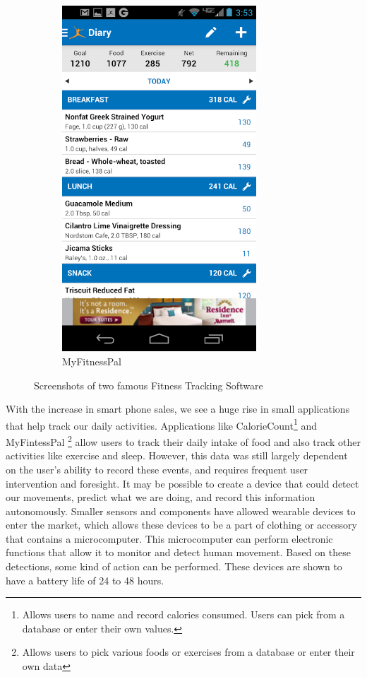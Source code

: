 \begin{figure}
\begin{subfigure}[b]{0.4\textwidth}
\includegraphics[width=0.8\textwidth]{images/MyFitScreenshot.png}
\caption{MyFitnessPal}
\label{fig:MyFitScreenshot}
\end{subfigure}
\caption{Screenshots of two famous Fitness Tracking Software}
\label{fig:FitnessScreenshots}
\end{figure}
With the increase in smart phone sales,
we see a huge rise in small applications that help track our daily activities.
Applications like CalorieCount\footnote{Allows users to name and record calories consumed.
Users can pick from a database or enter their own values.} \cite{Web:CalorieCount} and MyFintessPal
\footnote{Allows users to pick various foods or exercises from a database or enter their own data} \cite{Web:MFP}
allow users to track their daily intake of food and also track other activities like exercise and sleep.
However, this data was still largely dependent on the user's ability to record these events,
and requires frequent user intervention and foresight.
It may be possible to create a device that could detect our movements,
predict what we are doing, and record this information autonomously.
Smaller sensors and components have allowed wearable devices to enter the market,
which allows these devices to be a part of clothing or accessory that contains
a microcomputer. This microcomputer can perform electronic functions that allow it to monitor and
detect human movement. Based on these detections, some kind of action can be performed.
These devices are shown to have a battery life of 24 to 48 hours.

